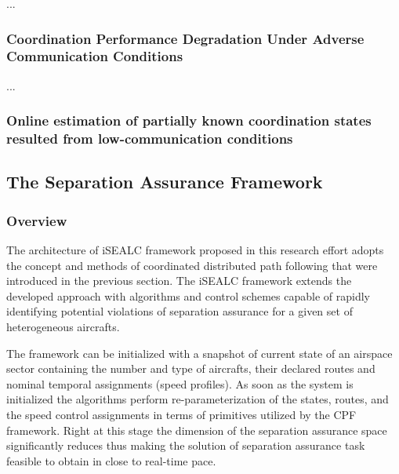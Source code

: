 \documentclass[letter,onecolumn,12pt]{aiaa-tc}
\newcommand{\1}{1_n}
\begin{document}
...

\subsubsection{Coordination Performance Degradation Under Adverse Communication Conditions}

...

\subsubsection{Online estimation of partially known coordination states resulted from low-communication conditions}

\subsection{The Separation Assurance Framework}
\label{subsec:framework}

\subsubsection{Overview}
The architecture of iSEALC framework proposed in this research effort adopts the concept and methods of coordinated distributed path following that were introduced in the previous section. The iSEALC framework extends the developed  approach with algorithms and control schemes capable of rapidly identifying potential violations of separation assurance for a given set of heterogeneous aircrafts.

The framework can be initialized with a snapshot of current state of an airspace sector containing the number and type of aircrafts, their declared routes and nominal temporal assignments (speed profiles). As soon as the system is initialized the algorithms perform re-parameterization of the states, routes, and the speed control assignments in terms of primitives utilized by the CPF framework. Right at this stage the dimension of the separation assurance space significantly reduces thus making the solution of separation assurance task feasible to obtain in close to real-time pace.
\end{document}
